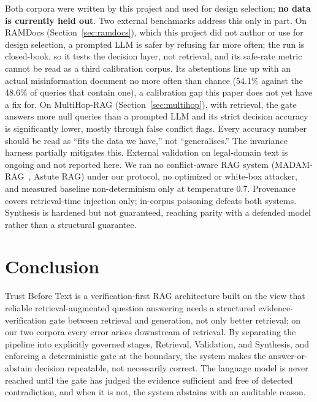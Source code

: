 \documentclass[conference]{IEEEtran}
\begin{document}
Both corpora were written by this project and used for design selection;
\textbf{no data is currently held out}. Two external
benchmarks address this only in part. On RAMDocs
(Section~\ref{sec:ramdocs}), which this project did not author or use for
design selection, a prompted LLM is safer by refusing far more often; the
run is closed-book, so it tests the decision layer, not retrieval, and its
safe-rate metric cannot be read as a third calibration corpus. Its
abstentions line up with an actual misinformation document no more often
than chance (54.1\% against the 48.6\% of queries that contain one), a
calibration gap this paper does not yet have a fix for. On MultiHop-RAG
(Section~\ref{sec:multihop}), with retrieval, the gate answers more null
queries than a prompted LLM and its strict decision accuracy is
significantly lower, mostly through false conflict flags. Every accuracy number should be
read as ``fits the data we have,'' not ``generalises.'' The invariance
harness partially mitigates this. External validation on legal-domain
text is ongoing and not reported here. We ran no conflict-aware RAG system
(MADAM-RAG~\cite{wang2025ramdocs}, Astute RAG) under our protocol, no
optimized or white-box attacker, and measured baseline non-determinism only
at temperature 0.7. Provenance covers retrieval-time
injection only; in-corpus poisoning defeats both systems. Synthesis is
hardened but not guaranteed, reaching parity with a defended model
rather than a structural guarantee.

\section{Conclusion}
\label{sec:conclusion}

Trust Before Text is a verification-first RAG architecture built on the
view that reliable retrieval-augmented question answering needs a
structured evidence-verification gate between retrieval and generation, not
only better retrieval; on our two corpora every error arises downstream of
retrieval. By separating
the pipeline into explicitly governed stages, Retrieval, Validation, and
Synthesis, and enforcing a deterministic gate at the boundary, the system
makes the answer-or-abstain decision repeatable, not necessarily correct.
The language model is never reached until the gate has judged the evidence
sufficient and free of detected contradiction, and when it is not, the
system abstains with an auditable reason.
\end{document}

